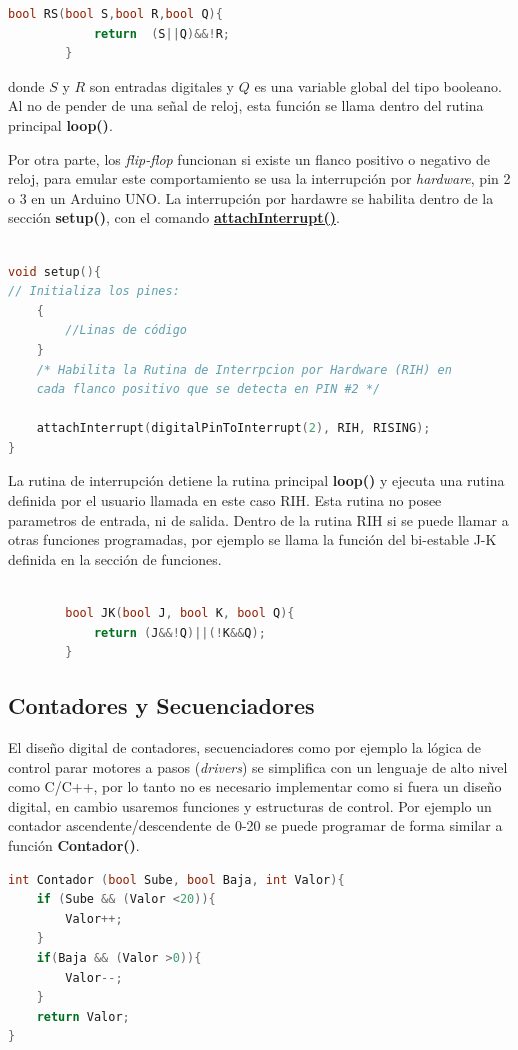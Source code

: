 		 \begin{lstlisting}[language=C++]
		bool RS(bool S,bool R,bool Q){
			return  (S||Q)&&!R;
		}
		\end{lstlisting} donde $S$ y $R$ son entradas digitales y $Q$ es una variable global del tipo booleano. Al no de pender de una señal de reloj, esta función se llama dentro del rutina principal \textbf{loop()}.

Por otra parte, los \textit{flip-flop} funcionan si existe un flanco positivo o negativo de reloj, para emular este comportamiento se usa  la interrupción por \textit{hardware}, pin 2 o 3  en un Arduino UNO. La interrupción por hardawre se habilita dentro de la sección \textbf{setup()}, con el comando \href{https://reference.arduino.cc/reference/en/language/functions/external-interrupts/attachinterrupt/}{ \textbf{attachInterrupt()}}.

	\begin{lstlisting}[language=C++]

void setup(){
// Initializa los pines:
	{
		//Linas de código
	}	
	/* Habilita la Rutina de Interrpcion por Hardware (RIH) en
	cada flanco positivo que se detecta en PIN #2 */
	
	attachInterrupt(digitalPinToInterrupt(2), RIH, RISING);
}
\end{lstlisting}

La rutina de interrupción detiene la rutina principal \textbf{loop()} y ejecuta una rutina definida por el usuario llamada en este caso RIH. Esta rutina no posee parametros de entrada, ni de salida. Dentro de la rutina  RIH si se puede llamar a otras funciones programadas, por ejemplo se llama la función del bi-estable J-K definida en la sección de funciones. 


		\begin{lstlisting}[language=C++]
		
		bool JK(bool J, bool K, bool Q){
			return (J&&!Q)||(!K&&Q);
		}
		\end{lstlisting}

\subsection{Contadores y Secuenciadores}


El diseño digital de contadores, secuenciadores como por ejemplo la lógica de control parar motores a pasos (\textit{drivers}) se simplifica con un lenguaje de alto nivel como C/C++, por lo tanto no es necesario implementar como si fuera un diseño digital, en cambio usaremos funciones y estructuras de control. Por ejemplo un contador ascendente/descendente de 0-20 se puede programar de forma similar a función \textbf{Contador()}.
\begin{lstlisting}[language=C++]
int Contador (bool Sube, bool Baja, int Valor){
	if (Sube && (Valor <20)){
		Valor++;
	}
	if(Baja && (Valor >0)){
		Valor--;
	}
	return Valor;
}
\end{lstlisting}
 
